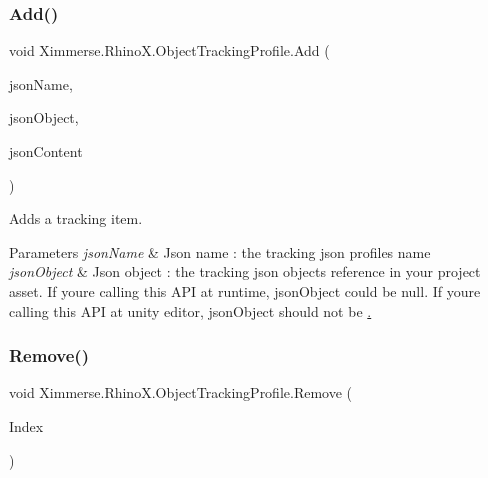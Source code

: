 \subsubsection{\texorpdfstring{Add()}{Add()}}
{\footnotesize\ttfamily void Ximmerse.\+Rhino\+X.\+Object\+Tracking\+Profile.\+Add (\begin{DoxyParamCaption}\item[{string}]{json\+Name,  }\item[{Unity\+Engine.\+Object}]{json\+Object,  }\item[{string}]{json\+Content }\end{DoxyParamCaption})\hspace{0.3cm}{\ttfamily [inline]}}



Adds a tracking item. 


\begin{DoxyParams}{Parameters}
{\em json\+Name} & Json name \+: the tracking json profile\textquotesingle{}s name\\
\hline
{\em json\+Object} & Json object \+: the tracking json object\textquotesingle{}s reference in your project asset. If you\textquotesingle{}re calling this A\+PI at runtime, json\+Object could be null. If you\textquotesingle{}re calling this A\+PI at unity editor, json\+Object should not be \mbox{\hyperlink{}{.}} \\
\hline
\end{DoxyParams}
\mbox{\label{class_ximmerse_1_1_rhino_x_1_1_object_tracking_profile_a7096567a6cc3599254f38f73aebc3b09}} 
\subsubsection{\texorpdfstring{Remove()}{Remove()}}
{\footnotesize\ttfamily void Ximmerse.\+Rhino\+X.\+Object\+Tracking\+Profile.\+Remove (\begin{DoxyParamCaption}\item[{int}]{Index }\end{DoxyParamCaption})\hspace{0.3cm}{\ttfamily [inline]}}



